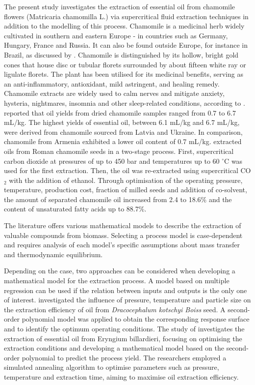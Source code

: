 \documentclass[a4paper,fleqn]{cas-dc}
\begin{document}
The present study investigates the extraction of essential oil from chamomile flowers (Matricaria chamomilla L.) via supercritical fluid extraction techniques in addition to the modelling of this process. Chamomile is a medicinal herb widely cultivated in southern and eastern Europe - in countries such as Germany, Hungary, France and Russia. It can also be found outside Europe, for instance in Brazil, as discussed by \citet{Singh2011}. Chamomile is distinguished by its hollow, bright gold cones that house disc or tubular florets surrounded by about fifteen white ray or ligulate florets. The plant has been utilised for its medicinal benefits, serving as an anti-inflammatory, antioxidant, mild astringent, and healing remedy. Chamomile extracts are widely used to calm nerves and mitigate anxiety, hysteria, nightmares, insomnia and other sleep-related conditions, according to \citet{Srivastava2009}. \citet{Orav2010} reported that oil yields from dried chamomile samples ranged from 0.7 to 6.7 mL/kg. The highest yields of essential oil, between 6.1 mL/kg and 6.7 mL/kg, were derived from chamomile sourced from Latvia and Ukraine. In comparison, chamomile from Armenia exhibited a lower oil content of 0.7 mL/kg. \citet{Milovanovic2023} extracted oils from Roman chamomile seeds in a two-stage process. First, supercritical carbon dioxide at pressures of up to 450 bar and temperatures up to 60 $^\circ$C was used for the first extraction. Then, the oil was re-extracted using supercritical CO$_2$ with the addition of ethanol. Through optimisation of the operating pressure, temperature, production cost, fraction of milled seeds and addition of co-solvent, the amount of separated chamomile oil increased from 2.4 to 18.6\% and the content of unsaturated fatty acids up to 88.7\%.

The literature offers various mathematical models to describe the extraction of valuable compounds from biomass. Selecting a process model is case-dependent and requires analysis of each model's specific assumptions about mass transfer and thermodynamic equilibrium.

Depending on the case, two approaches can be considered when developing a mathematical model for the extraction process. A model based on multiple regression can be used if the relation between inputs and outputs is the only one of interest. \citet{Sodeifian2017a} investigated the influence of pressure, temperature and particle size on the extraction efficiency of oil from \textit{Dracocephalum kotschyi Boiss} seed. A second-order polynomial model was applied to obtain the corresponding response surface and to identify the optimum operating conditions. The study of \citet{Sodeifian2017b} investigates the extraction of essential oil from Eryngium billardieri, focusing on optimising the extraction conditions and developing a mathematical model based on the second-order polynomial to predict the process yield. The researchers employed a simulated annealing algorithm to optimise parameters such as pressure, temperature and extraction time, aiming to maximise oil extraction efficiency.
\end{document}
